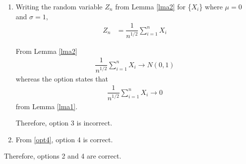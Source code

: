 \documentclass[journal,12pt,twocolumn]{IEEEtran}
\begin{document}
\begin{enumerate}
\item Writing the random variable $Z_n$ from Lemma \ref{lma2} for \{$X_i$\} where $\mu=0$ and $\sigma=1$,
\begin{align}
    Z_n &= \dfrac{1}{n^{1/2}} \sum_{i=1}^n X_i
\end{align}

From Lemma \ref{lma2} 
\begin{align}
    \dfrac{1}{n^{1/2}} \sum_{i=1}^n X_i \to  N(0,1)
\end{align}
whereas the option states that
\begin{align}
 \dfrac{1}{n^{1/2}} \sum_{i=1}^n X_i \to 0
\end{align} 
from Lemma \ref{lma1}.

Therefore, option 3 is incorrect.

\item From \eqref{opt4}, option 4 is correct.
\end{enumerate}
Therefore, options 2 and 4 are correct.
\end{document}
